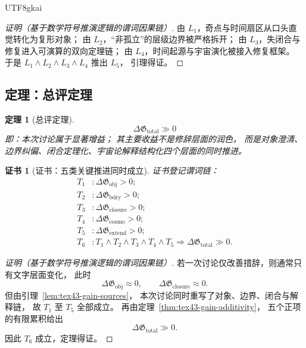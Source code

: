 \documentclass[12pt]{article}
\newtheorem{theorem}{定理}[section]
\newtheorem{Certificate}{证书}[section]
\begin{document}
\begin{CJK*}{UTF8}{gkai}
\begin{proof}[证明（基于数学符号推演逻辑的谓词因果链）]
由 $L_1$，奇点与时间扇区从口头直觉转化为复形对象；
由 $L_2$，“非孤立”的层级边界被严格拆开；
由 $L_3$，失闭合与修复进入可演算的双向定理链；
由 $L_4$，时间起源与宇宙演化被接入修复框架。
于是 $L_1\wedge L_2\wedge L_3\wedge L_4$ 推出 $L_5$，
引理得证。
\end{proof}

\subsection{定理：总评定理}
\label{subsec:tex43-ch11-theorem-total}

\begin{theorem}[总评定理]
\label{thm:tex43-gain-total}
\[
  \boxed{
    \Delta \mathfrak G_{\mathrm{total}} \gg 0
  }
\]
即：本次讨论属于显著增益；
其主要收益不是修辞层面的润色，
而是对象澄清、边界纠偏、闭合定理化、宇宙论解释结构化四个层面的同时推进。
\end{theorem}

\begin{Certificate}[证书：五类关键推进同时成立]
\label{cert:tex43-gain-total}
证书登记谓词链：
\[
\begin{aligned}
  T_1 &: \Delta \mathfrak G_{\mathrm{obj}}>0;\\
  T_2 &: \Delta \mathfrak G_{\mathrm{bdry}}>0;\\
  T_3 &: \Delta \mathfrak G_{\mathrm{closure}}>0;\\
  T_4 &: \Delta \mathfrak G_{\mathrm{cosmo}}>0;\\
  T_5 &: \Delta \mathfrak G_{\mathrm{extend}}>0;\\
  T_6 &: T_1\wedge T_2\wedge T_3\wedge T_4\wedge T_5
         \Rightarrow
         \Delta \mathfrak G_{\mathrm{total}}\gg 0.
\end{aligned}
\]
\end{Certificate}

\begin{proof}[证明（基于数学符号推演逻辑的谓词因果链）]
若一次讨论仅改善措辞，则通常只有文字层面变化，
此时
\[
  \Delta \mathfrak G_{\mathrm{obj}}\approx 0,
  \qquad
  \Delta \mathfrak G_{\mathrm{closure}}\approx 0.
\]
但由引理~\ref{lem:tex43-gain-sources}，
本次讨论同时重写了对象、边界、闭合与解释链，
故 $T_1$ 至 $T_5$ 全部成立。
再由定理~\ref{thm:tex43-gain-additivity}，
五个正项的有限累积给出
\[
  \Delta \mathfrak G_{\mathrm{total}}\gg 0.
\]
因此 $T_6$ 成立，定理得证。
\end{proof}


\end{CJK*}
\end{document}
